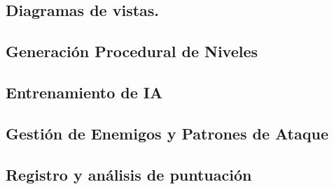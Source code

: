 \subsection*{Diagramas de vistas.}
\subsection{Generación Procedural de Niveles}





\subsection{Entrenamiento de IA}






\subsection{Gestión de Enemigos y Patrones de Ataque}







\subsection{Registro y análisis de puntuación}

